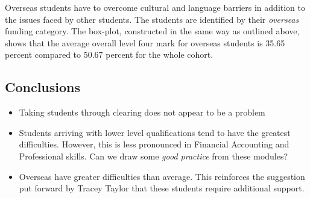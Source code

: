 \documentclass[12pt, a4paper, oneside]{article}\usepackage[]{graphicx}\usepackage[]{color}
\begin{document}
Overseas students have to overcome cultural and language barriers in addition to the issues faced by other students.  The students are identified by their \emph{overseas} funding category.  The box-plot, constructed in the same way as outlined above, shows that the average overall level four mark for overseas students is 35.65 percent compared to 50.67 percent for the whole cohort.  

\subsection*{Conclusions}
\begin{itemize}
\item Taking students through clearing does not appear to be a problem
\item Students arriving with lower level qualifications tend to have the greatest difficulties.  However, this is less pronounced in Financial Accounting and Professional skills.  Can we draw some \emph{good practice} from these modules?
\item Overseas have greater difficulties than average.  This reinforces the suggestion put forward by Tracey Taylor that these students require additional support. 
\end{itemize}
\end{document}
